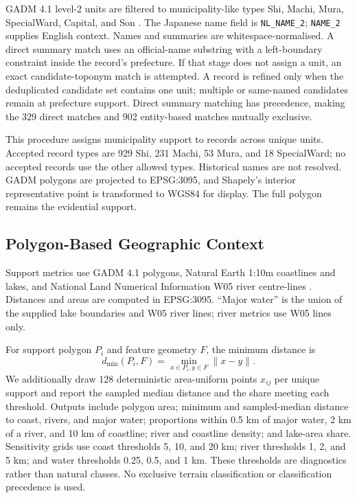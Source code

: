 \documentclass[9pt,twocolumn,a4paper]{extarticle}
\begin{document}
GADM 4.1 level-2 units are filtered to municipality-like types Shi, Machi, Mura, SpecialWard, Capital, and Son \citep{gadm41}. The Japanese name field is \texttt{NL\_NAME\_2}; \texttt{NAME\_2} supplies English context. Names and summaries are whitespace-normalised. A direct summary match uses an official-name substring with a left-boundary constraint inside the record's prefecture. If that stage does not assign a unit, an exact candidate-toponym match is attempted. A record is refined only when the deduplicated candidate set contains one unit; multiple or same-named candidates remain at prefecture support. Direct summary matching has precedence, making the 329 direct matches and 902 entity-based matches mutually exclusive.

This procedure assigns municipality support to \MunicipalityAnchorRecords{} records across \MunicipalitySupportUnits{} unique units. Accepted record types are 929 Shi, 231 Machi, 53 Mura, and 18 SpecialWard; no accepted records use the other allowed types. Historical names are not resolved. GADM polygons are projected to EPSG:3095, and Shapely's interior representative point is transformed to WGS84 for display. The full polygon remains the evidential support.

\subsection{Polygon-Based Geographic Context}

Support metrics use GADM 4.1 polygons, Natural Earth 1:10m coastlines and lakes, and National Land Numerical Information W05 river centre-lines \citep{gadm41,naturalearth,mlitw05}. Distances and areas are computed in EPSG:3095. ``Major water'' is the union of the supplied lake boundaries and W05 river lines; river metrics use W05 lines only.

For support polygon \(P_i\) and feature geometry \(F\), the minimum distance is
\begin{equation}
d_{\min}(P_i,F)=\min_{x\in P_i,y\in F}\lVert x-y\rVert .
\label{eq:distance}
\end{equation}
We additionally draw 128 deterministic area-uniform points \(x_{ij}\) per unique support and report the sampled median distance and the share meeting each threshold. Outputs include polygon area; minimum and sampled-median distance to coast, rivers, and major water; proportions within 0.5 km of major water, 2 km of a river, and 10 km of coastline; river and coastline density; and lake-area share. Sensitivity grids use coast thresholds 5, 10, and 20 km; river thresholds 1, 2, and 5 km; and water thresholds 0.25, 0.5, and 1 km. These thresholds are diagnostics rather than natural classes. No exclusive terrain classification or classification precedence is used.
\end{document}
